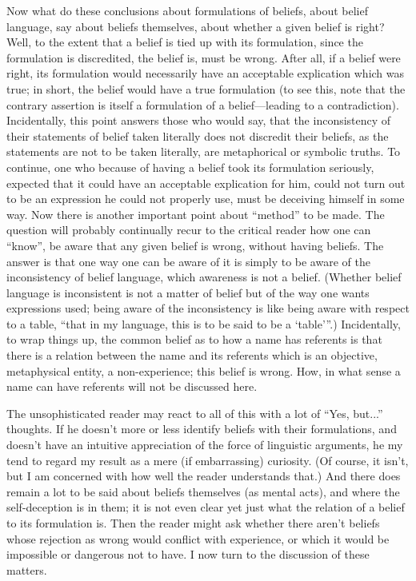 Now what do these conclusions about formulations of beliefs, about 
belief language, say about beliefs themselves, about whether a given belief is 
right? Well, to the extent that a belief is tied up with its formulation, since 
the formulation is discredited, the belief is, must be wrong. After all, if a 
belief were right, its formulation would necessarily have an acceptable 
explication which was true; in short, the belief would have a true 
formulation (to see this, note that the contrary assertion is itself a 
formulation of a belief---leading to a contradiction). Incidentally, this point 
answers those who would say, that the inconsistency of their statements of 
belief taken literally does not discredit their beliefs, as the statements are not 
to be taken literally, are metaphorical or symbolic truths. To continue, one 
who because of having a belief took its formulation seriously, expected that 
it could have an acceptable explication for him, could not turn out to be an 
expression he could not properly use, must be deceiving himself in some 
way. Now there is another important point about \enquote{method} to be made. 
The question will probably continually recur to the critical reader how one 
can \enquote{know}, be aware that any given belief is wrong, without having beliefs. 
The answer is that one way one can be aware of it is simply to be aware of 
the inconsistency of belief language, which awareness is not a belief. 
(Whether belief language is inconsistent is not a matter of belief but of the 
way one wants expressions used; being aware of the inconsistency is like 
being aware with respect to a table, \enquote{that in my language, this is to be said to 
be a \enquote{table}}.) Incidentally, to wrap things up, the common belief as to how 
a name has referents is that there is a relation between the name and its 
referents which is an objective, metaphysical entity, a non-experience; this 
belief is wrong. How, in what sense a name can have referents will not be 
discussed here. 

The unsophisticated reader may react to all of this with a lot of \enquote{Yes, 
but...} thoughts. If he doesn't more or less identify beliefs with their 
formulations, and doesn't have an intuitive appreciation of the force of 
linguistic arguments, he my tend to regard my result as a mere (if 
embarrassing) curiosity. (Of course, it isn't, but I am concerned with how 
well the reader understands that.) And there does remain a lot to be said 
about beliefs themselves (as mental acts), and where the self-deception is in 
them; it is not even clear yet just what the relation of a belief to its 
formulation is. Then the reader might ask whether there aren't beliefs whose 
rejection as wrong would conflict with experience, or which it would be 
impossible or dangerous not to have. I now turn to the discussion of these 
matters. 

